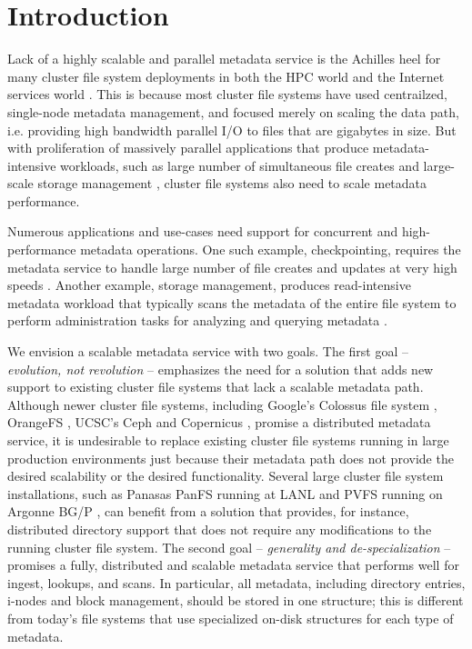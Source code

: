 \section{Introduction}

Lack of a highly scalable and parallel metadata service is the
Achilles heel for many cluster file system deployments in both the HPC world
\cite{hpcs-io:2008, hecfsio:tr06} and the Internet services world \cite{HDFS}.
This is because most cluster file systems have used centrailzed, single-node
metadata management, and focused merely on scaling the data path,
i.e. providing high bandwidth parallel I/O to files that are gigabytes in size.
But with proliferation of massively parallel applications that produce
metadata-intensive workloads, such as large number of simultaneous file creates
\cite{PLFS} and large-scale storage management \cite{issdm}, cluster file systems
also need to scale metadata performance.

Numerous applications and use-cases need support for concurrent and
high-performance metadata operations.
One such example, checkpointing, requires the metadata service to
handle large number of file creates and updates at very high speeds
\cite{PLFS}.
Another example, storage management, produces read-intensive metadata workload
that typically scans the metadata of the entire file system to perform
administration tasks for analyzing and querying metadata \cite{filemgmt-ucsc, magellan-ucsc}.

We envision a scalable metadata service with two goals.
The first goal -- \textit{evolution, not revolution} -- emphasizes the need for
a solution that adds new support to existing cluster file systems that lack a
scalable metadata path.
Although newer cluster file systems, including Google's Colossus file system
\cite{50mfiles-in-googlefs:fikes10}, OrangeFS \cite{OrangeFS}, UCSC's Ceph \cite{ceph:weil06} and 
Copernicus \cite{sfs-ucsc}, promise a distributed metadata
service, it is
undesirable to replace existing cluster file systems running in large production
environments just because their metadata path does not provide the desired
scalability or the desired functionality.
Several large cluster file system installations, such as Panasas PanFS running
at LANL \cite{panfs:welch08} and PVFS running on Argonne BG/P
\cite{bgp, pvfs:www}, can
benefit from a solution that provides, for instance, distributed directory support
that does not require any modifications to the running cluster file system.
The second goal -- \textit{generality and de-specialization} -- promises a
fully, distributed and
scalable metadata service that performs well for ingest, lookups, and scans.
In particular, all metadata, including directory entries, i-nodes and block
management, should be stored in one structure; this is different from
today's file systems that use specialized on-disk structures for each type of
metadata.


